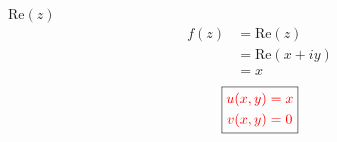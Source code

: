 \item[5.] Re$(z)$
\begin{align*}
    f(z) 
    &= \text{Re}(z) \\
    &= \text{Re}(x+iy)\\
    &= x
\end{align*}
\[
\boxed{
\textcolor{red}{
\begin{aligned}
u(x,y) &= x \\
v(x,y) &= 0
\end{aligned}
}
}
\]
